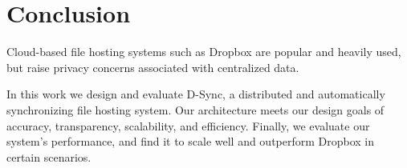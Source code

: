 \section{Conclusion}
\label{conclusion}
Cloud-based file hosting systems such as Dropbox
are popular and heavily used,
but raise privacy concerns associated with centralized data.

In this work we design and evaluate D-Sync,
a distributed and automatically synchronizing file hosting system.
Our architecture meets our design goals of accuracy, transparency,
scalability, and efficiency.
Finally, we evaluate our system's performance, and find it to
scale well and outperform Dropbox in certain scenarios.

